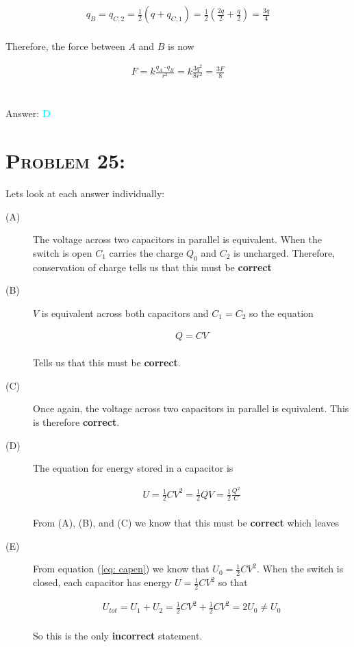\documentclass{article}
\begin{document}
\begin{gather}
q_{B} = q_{C,2} =  \frac{1}{2} (q + q_{C,1}) = \frac{1}{2} \left(\frac{2q}{2} + \frac{q}{2}\right) = \frac{3q}{4}\nonumber
\end{gather}
\\
Therefore, the force between $A$ and $B$ is now

\begin{gather}
F = k \frac{q_{A} \cdot q_{B}}{r^{2}} = k \frac{3q^{2}}{8r^{2}} =\boxed{\frac{3F}{8}}\nonumber
\end{gather}
\\\\
Answer: \textbf{\textcolor{cyan}D}\\


\section{\textsc{Problem 25:}} Lets look at each answer individually:

\begin{description}

\item[(A)] The voltage across two capacitors in parallel is equivalent. When the switch is open $C_{1}$ carries the charge $Q_{0}$ and $C_{2}$ is uncharged. Therefore, conservation of charge tells us that this must be \textbf{correct}

\item[(B)] $V$ is equivalent across both capacitors and $C_{1} = C_{2}$ so the equation 

\begin{gather}
Q = CV
\end{gather}
\\
Tells us that this must be \textbf{correct}.

\item[(C)] Once again, the voltage across two capacitors in parallel is equivalent. This is therefore \textbf{correct}.

\item[(D)] The equation for energy stored in a capacitor is 

\begin{gather}
\label{eq: capen} U = \frac{1}{2}CV^{2} =  \frac{1}{2}QV =  \frac{1}{2}\frac{Q^{2}}{C}
\end{gather}
\\
From (A), (B), and (C) we know that this must be \textbf{correct} which leaves

\item[(E)] From equation (\ref{eq: capen}) we know that $U_{0} =  \frac{1}{2}CV^{2}$. When the switch is closed, each capacitor has energy $U = \frac{1}{2}CV^{2}$ so that

\begin{gather}
U_{tot} = U_{1} + U_{2} = \frac{1}{2}CV^{2} + \frac{1}{2}CV^{2} = 2U_{0} \neq U_{0}\nonumber
\end{gather}
\\
So this is the only \textbf{incorrect} statement.
\\
\end{description}
\end{document}
